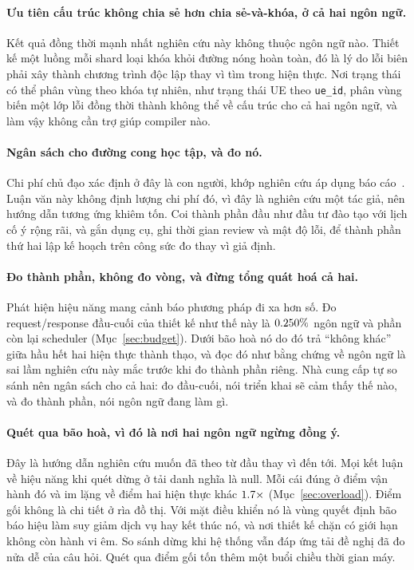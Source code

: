 \paragraph{Ưu tiên cấu trúc không chia sẻ hơn chia sẻ-và-khóa, ở cả hai ngôn ngữ.}
Kết quả đồng thời mạnh nhất nghiên cứu này không thuộc ngôn ngữ nào. Thiết kế
một luồng mỗi shard loại khóa khỏi đường nóng hoàn toàn, đó là lý do lỗi biên
phải xây thành chương trình độc lập thay vì tìm trong hiện thực.
Nơi trạng thái có thể phân vùng theo khóa tự nhiên, như trạng thái UE theo
\texttt{ue\_id}, phân vùng biến một lớp lỗi đồng thời thành
không thể về cấu trúc cho cả hai ngôn ngữ, và làm vậy không cần trợ giúp compiler nào.

\paragraph{Ngân sách cho đường cong học tập, và đo nó.}
Chi phí chủ đạo xác định ở đây là con người, khớp nghiên cứu áp dụng
báo cáo~\cite{fulton2021adopting}. Luận văn này không định lượng chi phí đó, vì đây là
nghiên cứu một tác giả, nên hướng dẫn tương ứng khiêm tốn. Coi thành phần đầu như
đầu tư đào tạo với lịch cố ý rộng rãi, và gắn dụng cụ, ghi
thời gian review và mật độ lỗi, để thành phần thứ hai lập kế hoạch trên công sức
đo thay vì giả định.

\paragraph{Đo thành phần, không đo vòng, và đừng tổng quát hoá cả hai.}
Phát hiện hiệu năng mang cảnh báo phương pháp đi xa hơn
số. Đo request/response đầu-cuối của thiết kế như thế này là
$0.250\%$ ngôn ngữ và phần còn lại scheduler (Mục~\ref{sec:budget}). Dưới
bão hoà nó do đó trả ``không khác'' giữa hầu hết hai hiện thực thành thạo, và đọc đó như bằng chứng về ngôn ngữ là sai lầm nghiên cứu này mắc
trước khi đo thành phần riêng. Nhà cung cấp tự so sánh nên ngân sách cho
cả hai: đo đầu-cuối, nói triển khai sẽ cảm thấy thế nào, và đo thành phần,
nói ngôn ngữ đang làm gì.

\paragraph{Quét qua bão hoà, vì đó là nơi hai ngôn ngữ ngừng đồng ý.}
Đây là hướng dẫn nghiên cứu muốn đã theo từ đầu thay vì
đến tới. Mọi kết luận về hiệu năng khi quét dừng ở tải danh nghĩa
là null. Mỗi cái đúng ở điểm vận hành đó và im lặng về điểm hai
hiện thực khác $1.7\times$ (Mục~\ref{sec:overload}). Điểm gối không
là chi tiết ở rìa đồ thị. Với mặt điều khiển nó là vùng quyết định
bão báo hiệu làm suy giảm dịch vụ hay kết thúc nó, và nơi thiết kế chặn có giới hạn
không còn hành vi êm. So sánh dừng khi hệ thống vẫn đáp ứng tải
đề nghị đã đo nửa dễ của câu hỏi. Quét qua điểm gối tốn thêm
một buổi chiều thời gian máy.

